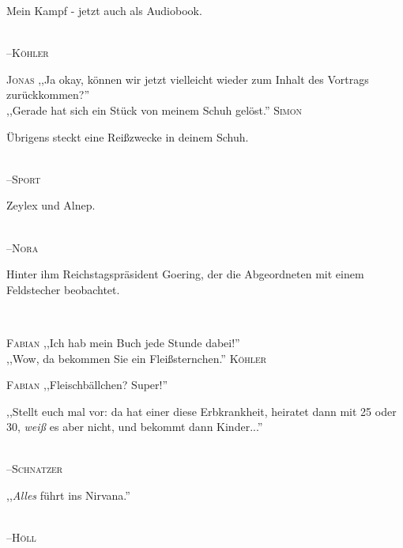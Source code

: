 \vspace{3mm}
{\raggedright Mein Kampf - jetzt auch als Audiobook.}\\
\raggedleft \textsc{\footnotesize --\/Köhler}\\

\vspace{3mm}
\hangindent=0.7cm
\raggedright \textsc{\footnotesize Jonas} ,,Ja okay, können wir jetzt vielleicht wieder zum Inhalt des Vortrags zurückkommen?''\\
\raggedleft ,,Gerade hat sich ein Stück von meinem Schuh gelöst.'' \textsc{\footnotesize Simon}\\

\vspace{3mm}
{\raggedright Übrigens steckt eine Reißzwecke in deinem Schuh.}\\
\raggedleft \textsc{\footnotesize --\/Sport}\\

\vspace{3mm}
{\raggedright Zeylex und Alnep.}\\
\raggedleft \textsc{\footnotesize --\/Nora}\\

\vspace{3mm}
{\raggedright Hinter ihm Reichstagspräsident Goering, der die Abgeordneten mit einem Feldstecher beobachtet.}\\

\vspace{3mm}
\hangindent=0.7cm
\raggedright \textsc{\footnotesize Fabian} ,,Ich hab mein Buch jede Stunde dabei!''\\
\raggedleft ,,Wow, da bekommen Sie ein Fleißsternchen.'' \textsc{\footnotesize Köhler}\\
\hangindent=0.7cm
\raggedright \textsc{\footnotesize Fabian} ,,Fleischbällchen? Super!''\\

\vspace{3mm}
{\raggedright ,,Stellt euch mal vor: da hat einer diese Erbkrankheit, heiratet dann mit 25 oder 30, \emph{weiß} es aber nicht, und bekommt dann Kinder...''}\\
\raggedleft \textsc{\footnotesize --\/Schnatzer}\\

\vspace{3mm}
{\raggedright ,,\emph{Alles} führt ins Nirvana.''}\\
\raggedleft \textsc{\footnotesize --\/Höll}\\

